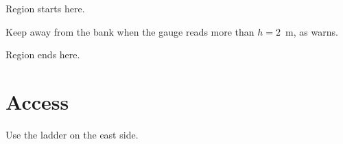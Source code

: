 \documentclass[11pt]{article}
\begin{document}
Region starts here.

{\color{red} Keep away from the bank} when the gauge reads more than $h = 2$~m, as \textcite{Okafor2021} warns.

Region ends here.

\section{Access}
Use the ladder on the east side.

\printbibliography
\end{document}
